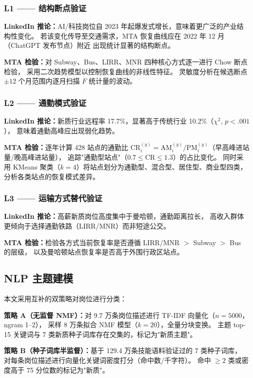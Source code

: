 \documentclass[runningheads]{llncs}
\begin{document}
\subsubsection*{L1 —— 结构断点验证}

\textbf{LinkedIn 推论：}AI/科技岗位自 2023 年起爆发式增长，意味着更广泛的产业结构性变化。
若该变化传导至交通需求，MTA 恢复曲线应在 2022 年 12 月（ChatGPT 发布节点）附近
出现统计显著的结构断点。

\textbf{MTA 检验：}对 Subway、Bus、LIRR、MNR 四种核心方式逐一进行 Chow 断点检验，
采用二次趋势模型以控制恢复曲线的非线性特征。
灵敏度分析在候选断点 $\pm 12$ 个月范围内逐月扫描 $F$ 统计量的波动。

\subsubsection*{L2 —— 通勤模式验证}

\textbf{LinkedIn 推论：}新质行业远程率 17.7\%，显著高于传统行业 10.2\%（$\chi^2$, $p<.001$），
意味着通勤高峰应出现弱化趋势。

\textbf{MTA 检验：}逐年计算 428 站点的通勤比
$\text{CR}_i^{(y)} = \text{AM}_i^{(y)} / \text{PM}_i^{(y)}$（早高峰进站量/晚高峰进站量），
追踪"通勤型站点"（$0.7 \leq \text{CR} \leq 1.3$）的占比变化。
同时采用 KMeans 聚类（$k=4$）将站点划分为通勤型、混合型、居住型、商业型四类，
分析各类站点的恢复模式差异。

\subsubsection*{L3 —— 运输方式替代验证}

\textbf{LinkedIn 推论：}高薪新质岗位高度集中于曼哈顿，通勤距离拉长，
高收入群体更倾向于选择通勤铁路（LIRR/MNR）而非短途公交。

\textbf{MTA 检验：}检验各方式当前恢复率是否遵循 LIRR/MNR $>$ Subway $>$ Bus 的层级，
以及曼哈顿站点恢复率是否高于外围行政区站点。

\subsection{NLP 主题建模}

本文采用互补的双策略对岗位进行分类：

\textbf{策略 A（无监督 NMF）：}对 9.7 万条岗位描述进行 TF-IDF 向量化（$n=5000$，ngram 1--2），
采样 8 万条拟合 NMF 模型（$k=20$），全量分块变换。
主题 top-15 关键词与 7 类新质种子词库存在交集的，标记为"新质主题"。

\textbf{策略 B（种子词库半监督）：}基于 129.4 万条技能语料验证过的 7 类种子词库，
对每条岗位描述进行向量化关键词密度打分（命中数/千字符）。
命中 $\geq 2$ 类或密度高于 75 分位数的标记为"新质"。
\end{document}

